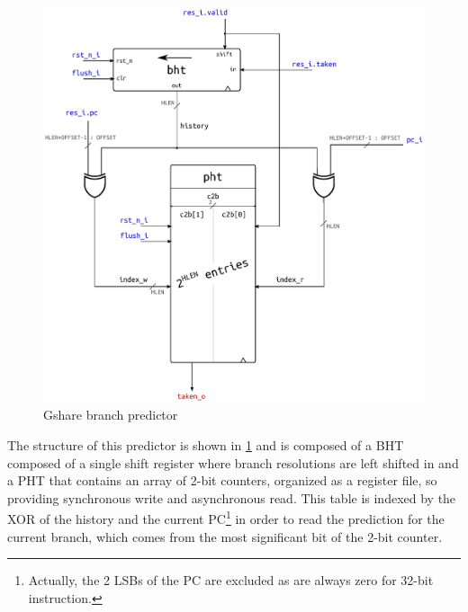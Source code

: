 \begin{figure}[hbt]
  \centering
  \includegraphics[width=.9\textwidth]{img/gshare.pdf}
  \caption{Gshare branch predictor}
  \label{fig:gshare}
\end{figure}
The structure of this predictor is shown in \cref{fig:gshare} and is composed of a \ac{BHT} composed of a single shift register where branch resolutions are left shifted in and a \ac{PHT} that contains an array of 2-bit counters, organized as a register file, so providing synchronous write and asynchronous read. This table is indexed by the XOR of the history and the current \ac{PC}\footnote{Actually, the 2 \acsp{LSB} of the \ac{PC} are excluded as are always zero for 32-bit instruction.} in order to read the prediction for the current branch, which comes from the most significant bit of the 2-bit counter.

